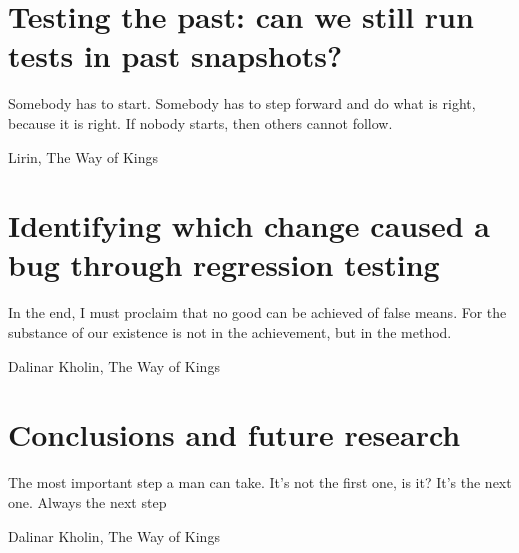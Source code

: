 \documentclass[11pt,a4paper,twoside]{book}
\begin{document}
\chapter{Testing the past: can we still run tests in past snapshots?}
\begin{FraseCelebre}
    \begin{Frase}
        Somebody has to start. Somebody has to step forward and do what is right, because it is right. If nobody starts, then others cannot follow.
    \end{Frase}
    \begin{Fuente}
        Lirin, The Way of Kings
    \end{Fuente}
\end{FraseCelebre}
\label{chapter:testability}


\chapter{Identifying which change caused a bug through regression testing}
\begin{FraseCelebre}
    \begin{Frase}
        In the end, I must proclaim that no good can be achieved of false means. For the substance of our existence is not in the achievement, but in the method.
    \end{Frase}
    \begin{Fuente}
        Dalinar Kholin, The Way of Kings
    \end{Fuente}
\end{FraseCelebre}
\label{chapter:bug-hunter}


\chapter{Conclusions and future research}
\begin{FraseCelebre}
    \begin{Frase}
        The most important step a man can take. It's not the first one, is it? It's the next one. Always the next step
    \end{Frase}
    \begin{Fuente}
        Dalinar Kholin, The Way of Kings
    \end{Fuente}
\end{FraseCelebre}
\label{chapter:conclusions}


\backmatter

%
%



\end{document}
